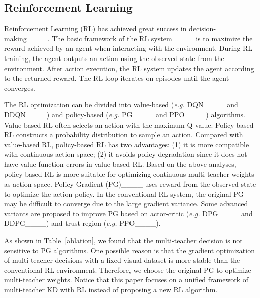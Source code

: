 	
	\subsection{Reinforcement Learning}
	Reinforcement Learning (RL) has achieved great success in decision-making____. The basic framework of the RL system____ is to maximize the reward achieved by an agent when interacting with the environment. During RL training, the agent outputs an action using the observed state from the environment.  After action execution, the RL system updates the agent according to the returned reward. The RL loop iterates on episodes until the agent converges.
	
	The RL optimization can be divided into value-based (\emph{e.g. }DQN____ and DDQN____) and policy-based (\emph{e.g. } PG____ and PPO____) algorithms. Value-based RL often selects an action with the maximum Q-value.  Policy-based RL constructs a probability distribution to sample an action. Compared with value-based RL, policy-based RL has two advantages: (1) it is more compatible with continuous action space; (2) it avoids policy degradation since it does not have value function errors in value-based RL. Based on the above analyses, policy-based RL is more suitable for optimizing continuous multi-teacher weights as action space. Policy Gradient (PG)____ uses reward from the observed state to optimize the action policy. In the conventional RL system, the original PG may be difficult to converge due to the large gradient variance. Some advanced variants are proposed to improve PG based on actor-critic (\emph{e.g. }DPG____ and DDPG____) and trust region (\emph{e.g. }PPO____). 
	
	As shown in Table~\ref{ablation}, we found that the multi-teacher decision is not sensitive to PG algorithms. One possible reason is that the gradient optimization of multi-teacher decisions with a fixed visual dataset is more stable than the conventional RL environment. Therefore, we choose the original PG to optimize multi-teacher weights. Notice that this paper focuses on a unified framework of multi-teacher KD with RL instead of proposing a new RL algorithm.